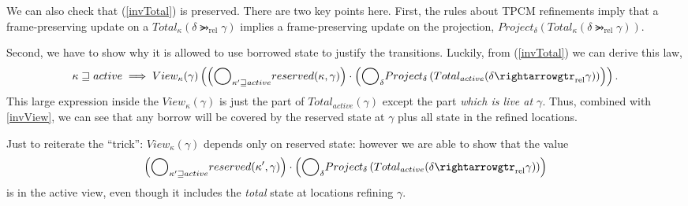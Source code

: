 \documentclass{article}
\DeclareMathOperator{\rel}{rel}
\newcommand{\refines}{\rightarrowgtr}
\newcommand{\ltGe}{\sqsupseteq}
\newcommand\Bigcircle{\raisebox{-0.5mm}{\scalebox{1.7}{$\bigcirc$}}}
\begin{document}
We can also check that (\ref{invTotal}) is preserved. There are two key points here.
First, the rules about TPCM refinements imply that a frame-preserving update on a
$Total_\kappa(\delta \refines_{\rel} \gamma)$ implies a frame-preserving update
on the projection,
$Project_\delta(Total_\kappa(\delta \refines_{\rel} \gamma))$.

Second, we have to show why it is allowed to use borrowed state to justify the transitions.
Luckily, from (\ref{invTotal}) we can derive this law,
\[
  \kappa \ltGe active \implies View_\kappa(\gamma)\left(
      \left(
        \Bigcircle_{\kappa' \ltGe active} reserved(\kappa,\gamma)
      \right) \cdot
      \left(
        \Bigcircle_{\delta} Project_\delta\left(Total_{active}(\delta \refines_{\rel} \gamma)\right)
      \right)
    \right).
    \label{invDerived}
\]
This large expression inside the $View_\kappa(\gamma)$ is just the part of
$Total_{active}(\gamma)$ except the part \emph{which is live at $\gamma$}.
Thus, combined with \ref{invView}, we can see that any borrow will be covered by the reserved 
state at $\gamma$ plus all state in the refined locations.

Just to reiterate the ``trick'': $View_\kappa(\gamma)$ depends only on reserved state:
however we are able to show that the value \[\left(
        \Bigcircle_{\kappa' \ltGe active} reserved(\kappa',\gamma)
      \right) \cdot
      \left(
        \Bigcircle_{\delta} Project_\delta\left(Total_{active}(\delta \refines_{\rel} \gamma)\right)
      \right)\] is in the active view, even though it includes the \emph{total} state at locations refining $\gamma$.
\end{document}
